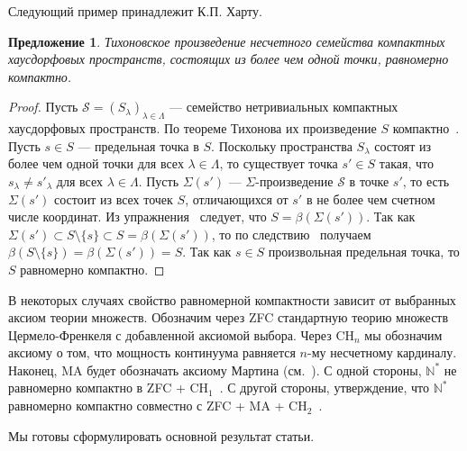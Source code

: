 \documentclass[12pt]{article}
\newtheorem{proposition}[theorem]{Предложение}
\begin{document}
Следующий пример принадлежит К.П. Харту.

\begin{proposition}\label{UcountProdCompSpIsUnifComp} Тихоновское произведение
    несчетного семейства компактных хаусдорфовых пространств, состоящих из более
    чем одной точки, равномерно компактно.
\end{proposition}
\begin{proof} Пусть $\mathcal{S}={(S_\lambda)}_{\lambda\in\Lambda}$ ---
    семейство нетривиальных компактных хаусдорфовых пространств. По теореме
    Тихонова их произведение $S$ компактно~\cite[теорема 3.2.4]{EngkingGenTop}.
    Пусть $s\in S$ --- предельная точка в $S$. Поскольку пространства
    $S_\lambda$ состоят из более чем одной точки для всех $\lambda\in\Lambda$,
    то существует точка $s'\in S$ такая, что $s_\lambda\neq s'_\lambda$ для всех
    $\lambda\in\Lambda$. Пусть $\Sigma(s')$ --- $\Sigma$-произведение
    $\mathcal{S}$ в точке $s'$, то есть $\Sigma(s')$ состоит из всех точек $S$,
    отличающихся от $s'$ в не более чем счетном числе координат. Из
    упражнения~\cite[упражнение 3.12.23(c)]{EngkingGenTop} следует, что
    $S=\beta(\Sigma(s'))$. Так как $\Sigma(s')\subset S\setminus \{s\}\subset
        S=\beta(\Sigma(s'))$, то по следствию~\cite[следствие 3.6.9]{EngkingGenTop}
    получаем $\beta(S\setminus \{s\})=\beta(\Sigma(s'))=S$. Так как $s\in S$
    произвольная предельная точка, то $S$ равномерно компактно.
\end{proof}

В некоторых случаях свойство равномерной компактности зависит от выбранных
аксиом теории множеств. Обозначим через \textsc{ZFC} стандартную теорию множеств
Цермело-Френкеля с добавленной аксиомой выбора. Через \textsc{CH}$_n$ мы
обозначим аксиому о том, что мощность континуума равняется $n$-му несчетному
кардиналу. Наконец, \textsc{MA} будет обозначать аксиому Мартина
(см.~\cite{KunSetThIndepPrf}). С одной стороны, $\mathbb{N}^*$ не равномерно
компактно в \textsc{ZFC + CH$_1$}~\cite{FinGillExtContFuncbN}. С другой стороны,
утверждение, что $\mathbb{N}^*$ равномерно компактно совместно с \textsc{ZFC +
    MA + CH$_2$}~\cite{DouKunMillCStarEmbdDenPropSbspStoneRemN}.

Мы готовы сформулировать основной результат статьи.
\end{document}
